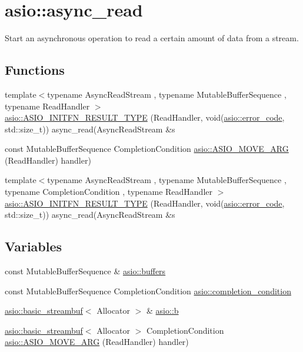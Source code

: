 \hypertarget{group__async__read}{}\section{asio\+:\+:async\+\_\+read}
\label{group__async__read}


Start an asynchronous operation to read a certain amount of data from a stream.  


\subsection*{Functions}
\begin{DoxyCompactItemize}
\item 
{\footnotesize template$<$typename Async\+Read\+Stream , typename Mutable\+Buffer\+Sequence , typename Read\+Handler $>$ }\\\hyperlink{group__async__read_ga3d4f5c52cc8c1c5d16fc7bf7e0f75c4b}{asio\+::\+A\+S\+I\+O\+\_\+\+I\+N\+I\+T\+F\+N\+\_\+\+R\+E\+S\+U\+L\+T\+\_\+\+T\+Y\+P\+E} (Read\+Handler, void(\hyperlink{classasio_1_1error__code}{asio\+::error\+\_\+code}, std\+::size\+\_\+t)) async\+\_\+read(Async\+Read\+Stream \&s
\item 
const Mutable\+Buffer\+Sequence Completion\+Condition \hyperlink{group__async__read_gac41f6414b06e189a76689422b8e2db35}{asio\+::\+A\+S\+I\+O\+\_\+\+M\+O\+V\+E\+\_\+\+A\+R\+G} (Read\+Handler) handler)
\item 
{\footnotesize template$<$typename Async\+Read\+Stream , typename Mutable\+Buffer\+Sequence , typename Completion\+Condition , typename Read\+Handler $>$ }\\\hyperlink{group__async__read_gab321259782b3683c80f33eb1050a3251}{asio\+::\+A\+S\+I\+O\+\_\+\+I\+N\+I\+T\+F\+N\+\_\+\+R\+E\+S\+U\+L\+T\+\_\+\+T\+Y\+P\+E} (Read\+Handler, void(\hyperlink{classasio_1_1error__code}{asio\+::error\+\_\+code}, std\+::size\+\_\+t)) async\+\_\+read(Async\+Read\+Stream \&s
\end{DoxyCompactItemize}
\subsection*{Variables}
\begin{DoxyCompactItemize}
\item 
const Mutable\+Buffer\+Sequence \& \hyperlink{group__async__read_ga54dede45c3175148a77fe6635222c47d}{asio\+::buffers}
\item 
const Mutable\+Buffer\+Sequence Completion\+Condition \hyperlink{group__async__read_gae2e215d5013596cc2b385bb6c13fa518}{asio\+::completion\+\_\+condition}
\item 
\hyperlink{classasio_1_1basic__streambuf}{asio\+::basic\+\_\+streambuf}$<$ Allocator $>$ \& \hyperlink{group__async__read_ga945a5c18fa77a9e2eba420f8f44b2a4f}{asio\+::b}
\item 
\hyperlink{classasio_1_1basic__streambuf}{asio\+::basic\+\_\+streambuf}$<$ Allocator $>$ Completion\+Condition \hyperlink{group__async__read_ga6d72a97784dde9476c6d93b8904a4967}{asio\+::\+A\+S\+I\+O\+\_\+\+M\+O\+V\+E\+\_\+\+A\+R\+G} (Read\+Handler) handler)
\end{DoxyCompactItemize}


